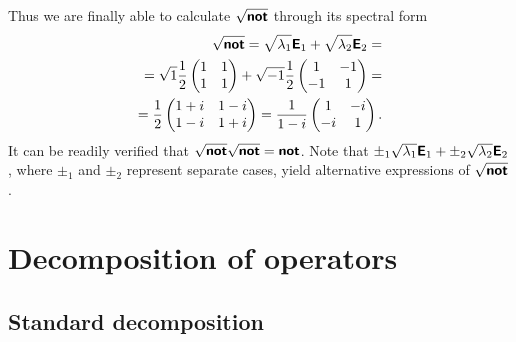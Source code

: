 {Thus we are finally able to calculate
$\sqrt{\textsf{\textbf{not}}}$
through its spectral form
\begin{equation}
\begin{split}
\sqrt{\textsf{\textbf{not}}}=
\sqrt{\lambda_1}\textsf{\textbf{E}}_1 +
\sqrt{\lambda_2}\textsf{\textbf{E}}_2
=
\\=  \sqrt{1}
\frac{1}{2} \begin{pmatrix}
 1&1\\  1&1
\end{pmatrix}
+  \sqrt{-1}
\frac{1}{2} \begin{pmatrix}
 1&-1\\  -1&1
\end{pmatrix}
=
\\
=
\frac{1}{2}
\begin{pmatrix}
 1+i&1-i\\  1-i&1+i
\end{pmatrix}
=
\frac{1}{1-i}
\begin{pmatrix}
 1&-i\\  -i&1
\end{pmatrix}
.
\end{split}
\end{equation}
It can be readily verified that  $\sqrt{\textsf{\textbf{not}}}\sqrt{\textsf{\textbf{not}}}=\textsf{\textbf{not}}$.
Note that
$\pm_1 \sqrt{\lambda_1}\textsf{\textbf{E}}_1 +
\pm_2 \sqrt{\lambda_2}\textsf{\textbf{E}}_2$, where $\pm_1$ and $\pm_2$ represent separate cases,
yield alternative expressions of $\sqrt{\textsf{\textbf{not}}}$.



}

\section{Decomposition of operators}

\subsection{Standard decomposition}

